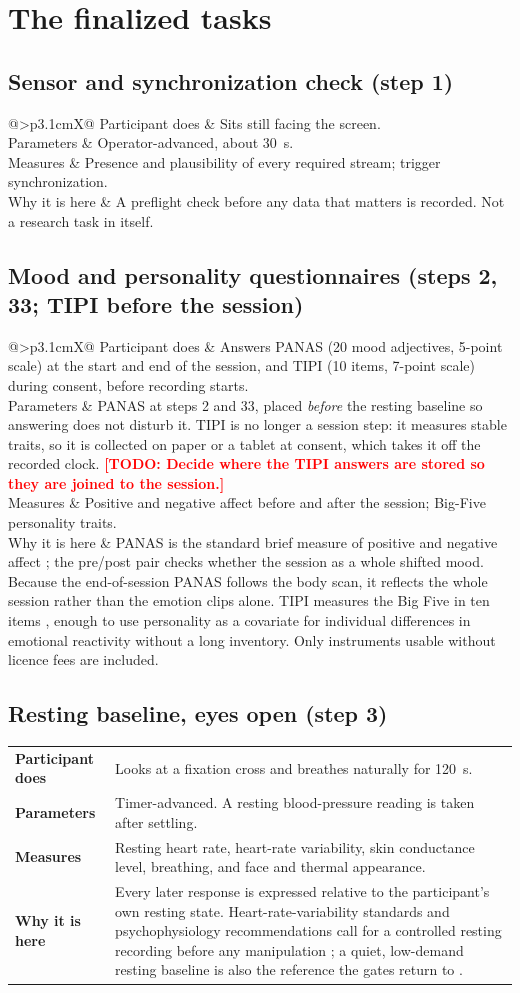\documentclass[11pt,a4paper]{article}
\makeatletter
\newcommand{\TODO}[1]{\textcolor{red}{\textbf{[TODO: #1]}}}
\newcommand{\taskdetail}[4]{%
  \begin{tabularx}{\linewidth}{@{}>{\bfseries}p{3.1cm}X@{}}
    Participant does & #1 \\
    Parameters & #2 \\
    Measures & #3 \\
    Why it is here & #4 \\
  \end{tabularx}}
\makeatother
\begin{document}
\section{The finalized tasks}

\subsection{Sensor and synchronization check (step 1)}
\taskdetail
{Sits still facing the screen.}
{Operator-advanced, about 30~s.}
{Presence and plausibility of every required stream; trigger synchronization.}
{A preflight check before any data that matters is recorded. Not a research task in itself.}

\subsection{Mood and personality questionnaires (steps 2, 33; TIPI before the session)}
\taskdetail
{Answers PANAS (20 mood adjectives, 5-point scale) at the start and end of the session, and TIPI (10 items, 7-point
scale) during consent, before recording starts.}
{PANAS at steps 2 and 33, placed \emph{before} the resting baseline so answering does not disturb it. TIPI is no
longer a session step: it measures stable traits, so it is collected on paper or a tablet at consent, which takes
it off the recorded clock. \TODO{Decide where the TIPI answers are stored so they are joined to the session.}}
{Positive and negative affect before and after the session; Big-Five personality traits.}
{PANAS is the standard brief measure of positive and negative affect \cite{watson1988}; the pre/post pair checks
whether the session as a whole shifted mood. Because the end-of-session PANAS follows the body scan, it reflects the
whole session rather than the emotion clips alone. TIPI measures the Big Five in ten items \cite{gosling2003},
enough to use personality as a covariate for individual differences in emotional reactivity without a long
inventory. Only instruments usable without licence fees are included.}

\subsection{Resting baseline, eyes open (step 3)}
\taskdetail
{Looks at a fixation cross and breathes naturally for 120~s.}
{Timer-advanced. A resting blood-pressure reading is taken after settling.}
{Resting heart rate, heart-rate variability, skin conductance level, breathing, and face and thermal appearance.}
{Every later response is expressed relative to the participant's own resting state. Heart-rate-variability
standards and psychophysiology recommendations call for a controlled resting recording before any manipulation
\cite{taskforce1996,laborde2017}; a quiet, low-demand resting baseline is also the reference the gates return to
\cite{jennings1992}.}
\end{document}
